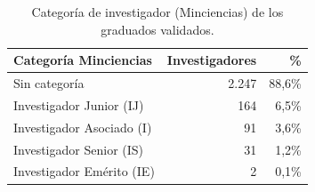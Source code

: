 \begin{table}[H]\centering\footnotesize
\caption{Categoría de investigador (Minciencias) de los graduados validados.}\label{tab:cvlac_categoria}
\begin{tabular}{lrr}
\toprule
\rowcolor{ustaazul}\textbf{\color{white}Categoría Minciencias} & \textbf{\color{white}Investigadores} & \textbf{\color{white}\%} \\
\midrule
Sin categoría & 2.247 & 88,6\% \\
Investigador Junior (IJ) & 164 & 6,5\% \\
Investigador Asociado (I) & 91 & 3,6\% \\
Investigador Senior (IS) & 31 & 1,2\% \\
Investigador Emérito (IE) & 2 & 0,1\% \\
\bottomrule
\end{tabular}
\end{table}